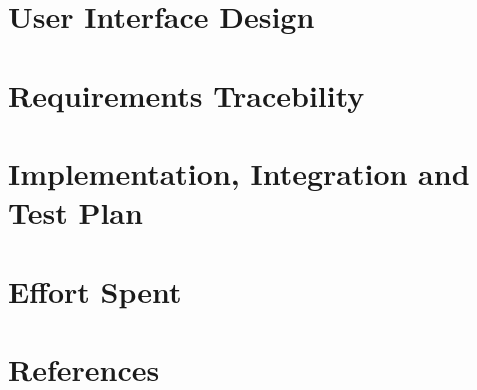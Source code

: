 \documentclass[fontsize=11pt,paper=a4,pagesize=auto]{report}
\begin{document}
\chapter{User Interface Design}


\chapter{Requirements Tracebility}




\chapter{Implementation, Integration and Test Plan}



\chapter{Effort Spent}



\chapter{References}

\end{document}
